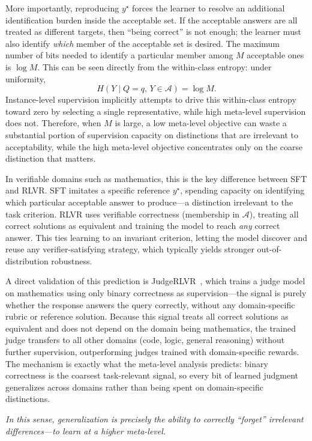 \documentclass{article}
\theoremstyle{plain}
\theoremstyle{definition}
\theoremstyle{remark}
\begin{document}
More importantly, reproducing $y^\star$ forces the learner to resolve an additional identification burden inside the acceptable set. If the acceptable answers are all treated as different targets, then ``being correct'' is not enough; the learner must also identify \textit{which} member of the acceptable set is desired. The maximum number of bits needed to identify a particular member among $M$ acceptable ones is $\log M$. This can be seen directly from the within-class entropy: under uniformity,
\[
H(Y \mid Q{=}q,\, Y\in\mathcal{A})  =  \log M.
\]
Instance-level supervision implicitly attempts to drive this within-class entropy toward zero by selecting a single representative, while high meta-level supervision does not. Therefore, when $M$ is large, a low meta-level objective can waste a substantial portion of supervision capacity on distinctions that are irrelevant to acceptability, while the high meta-level objective concentrates only on the coarse distinction that matters.

In verifiable domains such as mathematics, this is the key difference between SFT and RLVR. SFT imitates a specific reference $y^\star$, spending capacity on identifying which particular acceptable answer to produce---a distinction irrelevant to the task criterion. RLVR uses verifiable correctness (membership in $\mathcal{A}$), treating all correct solutions as equivalent and training the model to reach \textit{any} correct answer. This ties learning to an invariant criterion, letting the model discover and reuse any verifier-satisfying strategy, which typically yields stronger out-of-distribution robustness.

A direct validation of this prediction is JudgeRLVR~\cite{duoJudgeRLVRJudgeFirst2026}, which trains a judge model on mathematics using only binary correctness as supervision---the signal is purely whether the response answers the query correctly, without any domain-specific rubric or reference solution. Because this signal treats all correct solutions as equivalent and does not depend on the domain being mathematics, the trained judge transfers to all other domains (code, logic, general reasoning) without further supervision, outperforming judges trained with domain-specific rewards. The mechanism is exactly what the meta-level analysis predicts: binary correctness is the coarsest task-relevant signal, so every bit of learned judgment generalizes across domains rather than being spent on domain-specific distinctions.

\textit{In this sense, generalization is precisely the ability to correctly ``forget'' irrelevant differences---to learn at a higher meta-level.}
\end{document}
